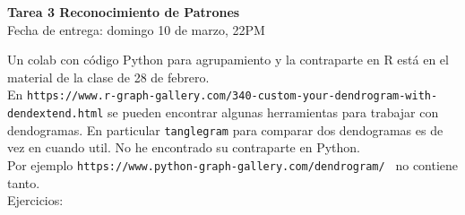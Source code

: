 \documentclass[12pt]{book}
\newcommand {\?}{?`}
\begin{document}
\specialaccent \mbox{} 
\begin{center}
{\Large \bf Tarea 3 Reconocimiento de Patrones} \\ Fecha de entrega: domingo  10 de marzo, 22PM \mbox{} \vspace{0.5cm} \\


\end{center}


Un colab con c\'odigo Python para agrupamiento y la contraparte en {\cal R}  est\'a en el material de la clase de 28 de febrero.\\

En \verb|https://www.r-graph-gallery.com/340-custom-your-dendrogram-with-dendextend.html| se pueden encontrar algunas herramientas para trabajar con dendogramas. En particular \verb|tanglegram| para comparar dos dendogramas es de vez en cuando util. No he encontrado su contraparte en Python.\\
Por ejemplo \verb|https://www.python-graph-gallery.com/dendrogram/ | no contiene tanto.   \\



Ejercicios: 
\end{document}
